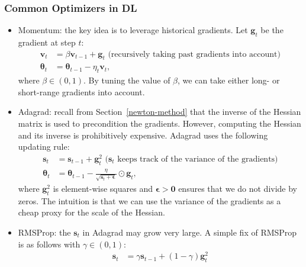     \subsubsection{Common Optimizers in DL}
        \begin{itemize}
            \item Momentum: the key idea is to leverage historical gradients. Let $\bm{g}_t$ be the gradient at step $t$:
                \begin{equation}
                    \begin{aligned}
                        \bm{v}_t & = \beta  \bm{v}_{t-1} + \bm{g}_t \text{ (recursively taking past gradients into account)}\\
                        \bm{\theta}_t & = \bm{\theta}_{t-1} - \eta_t \bm{v}_t,
                    \end{aligned}
                \end{equation}
            where $\beta \in (0, 1)$. By tuning the value of $\beta$, we can take either long- or short-range gradients into account.
            \item Adagrad: recall from Section~\ref{newton-method} that the inverse of the Hessian matrix is used to precondition the gradients. 
            However, computing the Hessian and its inverse is prohibitively expensive. 
            Adagrad uses the following updating rule:
                \begin{equation}
                    \begin{aligned}
                        \bm{s}_t & = \bm{s}_{t-1} + \bm{g}_t^2  \text{ ($\bm{s}_t$ keeps track of the variance of the gradients)}\\
                        \bm{\theta}_t & = \bm{\theta}_{t-1} - \frac{\eta}{\sqrt{\bm{s}_t + \bm{\epsilon}}} \odot \bm{g}_t,
                    \end{aligned}
                \end{equation}
            where $\bm{g}_t^2$ is element-wise squares and $\bm{\epsilon} > \bm{0}$ ensures that we do not divide by zeros.
            The intuition is that we can use the variance of the gradients as a cheap proxy for the scale of the Hessian. 
            \item RMSProp: the $\bm{s}_t$ in Adagrad may grow very large. A simple fix of RMSProp is as follows with $\gamma \in (0, 1)$:
                \begin{equation}
                    \begin{aligned}
                        \bm{s}_t & = \gamma \bm{s}_{t-1} + (1 - \gamma) \bm{g}_t^2  \\

\end{aligned}
\end{equation}
\end{itemize}
